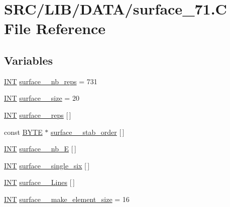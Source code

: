 \hypertarget{surface__71_8_c}{}\section{S\+R\+C/\+L\+I\+B/\+D\+A\+T\+A/surface\+\_\+71.C File Reference}
\label{surface__71_8_c}
\subsection*{Variables}
\begin{DoxyCompactItemize}
\item 
\mbox{\hyperlink{galois_8h_a09fddde158a3a20bd2dcadb609de11dc}{I\+NT}} \mbox{\hyperlink{surface__71_8_c_a3a1f6ee17845fc1101a94cd02cc455c4}{surface\+\_\+\_\+nb\+\_\+reps}} = 731
\item 
\mbox{\hyperlink{galois_8h_a09fddde158a3a20bd2dcadb609de11dc}{I\+NT}} \mbox{\hyperlink{surface__71_8_c_a83e0a6c4ac6db5d4961bf9062598c160}{surface\+\_\+\_\+size}} = 20
\item 
\mbox{\hyperlink{galois_8h_a09fddde158a3a20bd2dcadb609de11dc}{I\+NT}} \mbox{\hyperlink{surface__71_8_c_ae5439b303ccdf6666ada9342b759545b}{surface\+\_\+\_\+reps}} \mbox{[}$\,$\mbox{]}
\item 
const \mbox{\hyperlink{galois_8h_ab6cc7b4aeb6ea31aba2b3fbfc83ff5e6}{B\+Y\+TE}} $\ast$ \mbox{\hyperlink{surface__71_8_c_a8fc0f969589e56fa12961a8872548542}{surface\+\_\+\_\+stab\+\_\+order}} \mbox{[}$\,$\mbox{]}
\item 
\mbox{\hyperlink{galois_8h_a09fddde158a3a20bd2dcadb609de11dc}{I\+NT}} \mbox{\hyperlink{surface__71_8_c_a10146bad66f071a313e56ac31238351a}{surface\+\_\+\_\+nb\+\_\+E}} \mbox{[}$\,$\mbox{]}
\item 
\mbox{\hyperlink{galois_8h_a09fddde158a3a20bd2dcadb609de11dc}{I\+NT}} \mbox{\hyperlink{surface__71_8_c_ad72cea7022d1504eaf1ae3b2071aab7e}{surface\+\_\+\_\+single\+\_\+six}} \mbox{[}$\,$\mbox{]}
\item 
\mbox{\hyperlink{galois_8h_a09fddde158a3a20bd2dcadb609de11dc}{I\+NT}} \mbox{\hyperlink{surface__71_8_c_a2e85615e8dc18395979d1e6cac92d1f7}{surface\+\_\+\_\+\+Lines}} \mbox{[}$\,$\mbox{]}
\item 
\mbox{\hyperlink{galois_8h_a09fddde158a3a20bd2dcadb609de11dc}{I\+NT}} \mbox{\hyperlink{surface__71_8_c_a1ece62a9fdd23f51579fd08ec504abb2}{surface\+\_\+\_\+make\+\_\+element\+\_\+size}} = 16
\item 

\end{DoxyCompactItemize}
